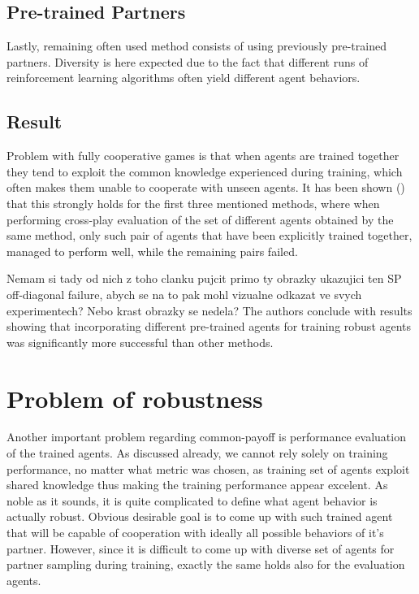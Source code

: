 \subsection{Pre-trained Partners}
Lastly, remaining often used method consists of using previously pre-trained partners.
Diversity is here expected due to the fact that different runs of reinforcement learning algorithms often yield different agent behaviors.


\subsection{Result}\label{offDiagonalReport}
Problem with fully cooperative games is that when agents are trained together they tend to exploit the common knowledge experienced during training, which often makes them unable to cooperate with unseen agents.
It has been shown (\cite{10.1007/978-3-030-63823-8_46}) that this strongly holds for the first three mentioned methods, 
where when performing cross-play evaluation of the set of different agents obtained by the same method, 
only such pair of agents that have been explicitly trained together, managed to perform well, while the remaining pairs failed.

{\color{blue} Nemam si tady od nich z toho clanku pujcit primo ty obrazky ukazujici ten SP off-diagonal failure, abych se na to pak mohl vizualne odkazat ve svych experimentech? 
Nebo krast obrazky se nedela?}
The authors conclude with results showing that incorporating different pre-trained agents for training robust agents was significantly more successful than other methods.


\section{Problem of robustness}
Another important problem regarding common-payoff is performance evaluation of the trained agents.
As discussed already, we cannot rely solely on training performance, no matter what metric was chosen, as training set of agents exploit shared knowledge thus making the training performance appear excelent.
As noble as it sounds, it is quite complicated to define what agent behavior is actually robust.
Obvious desirable goal is to come up with such trained agent that will be capable of cooperation with ideally all possible behaviors of it's partner.
However, since it is difficult to come up with diverse set of agents for partner sampling during training, exactly the same holds also for the evaluation agents.

